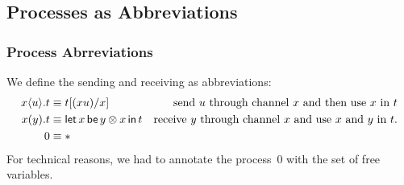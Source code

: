     \subsection{Processes as Abbreviations}

    \subsubsection{Process Abrreviations}
    We define the sending and receiving as abbreviations:
    \begin{align*}
     {x}\langle{u}\rangle.{t} &\equiv t[(xu) /x] &\text{send $u$ through channel
     $x$ and then use $x$ in $t$} \\
     {{x}({y}).{t}} &\equiv \mathsf{let }\,{x}\,\mathsf{ be }\,{y\otimes x}\,\mathsf{ in }\,{t} & \text{receive
     $y$ through channel $x$ and use $x$ and $y$ in $t$.} \\
     0 &\equiv \ast
    \end{align*}
    For technical reasons, we had to annotate the process~0 with the set
    of free variables.

